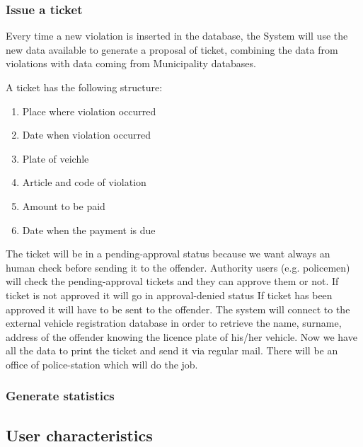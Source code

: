 \subsubsection{Issue a ticket}
Every time a new violation is inserted in the database, the System will use the new data available to generate a proposal of ticket, combining the data from violations with data coming from Municipality databases.

A ticket has the following structure:
\begin{enumerate}
  \item Place where violation occurred
  \item Date when violation occurred
  \item Plate of veichle
  \item Article and code of violation
  \item Amount to be paid
  \item Date when the payment is due
\end{enumerate}

The ticket will be in a pending-approval status because we want always an human check before sending it to the offender.
Authority users (e.g. policemen) will check the pending-approval tickets and they can approve them or not.
If ticket is not approved it will go in approval-denied status
If ticket has been approved it will have to be sent to the offender.
The system will connect to the external vehicle registration database in order to retrieve the name, surname, address of the offender knowing the licence plate of his/her vehicle.
Now we have all the data to print the ticket and send it via regular mail. There will be an office of police-station which will do the job.

\subsubsection{Generate statistics}

\subsection{User characteristics }


